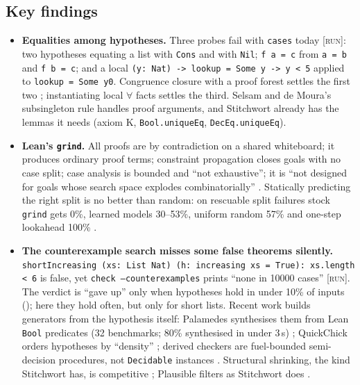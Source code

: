 \documentclass[11pt,a4paper]{article}
\newcommand{\code}[1]{\texttt{#1}}
\newcommand{\file}[1]{\path{#1}}
\newcommand{\run}{\textsc{[run]}}
\begin{document}
\subsection{Key findings}
\begin{itemize}
  \item \textbf{Equalities among hypotheses.} Three probes fail with \code{cases} today \run:
    two hypotheses equating a list with \code{Cons} and with \code{Nil}; \code{f a = c} from
    \code{a = b} and \code{f b = c}; and a local \code{(y: Nat) -> lookup = Some y -> y < 5}
    applied to \code{lookup = Some y0}. Congruence closure with a proof forest settles the first
    two \cite{selsam2016cc,lean2026grindsrc}; instantiating local $\forall$ facts settles the
    third. Selsam and de Moura's subsingleton rule handles proof arguments, and Stitchwort
    already has the lemmas it needs (axiom K, \code{Bool.uniqueEq}, \code{DecEq.uniqueEq}).
  \item \textbf{Lean's \code{grind}.} All proofs are by contradiction on a shared whiteboard;
    it produces ordinary proof terms; constraint propagation closes goals with no case split;
    case analysis is bounded and ``not exhaustive''; it is ``not designed for goals whose search
    space explodes combinatorially'' \cite{lean2026grind,demoura2025grind}. Statically
    predicting the right split is no better than random: on rescuable split failures stock
    \code{grind} gets 0\%, learned models 30--53\%, uniform random 57\% and one-step lookahead
    100\% \cite{wang2026learned}.
  \item \textbf{The counterexample search misses some false theorems silently.}
    \code{shortIncreasing (xs: List Nat) (h: increasing xs = True): xs.length < 6} is false, yet
    \code{check --counterexamples} prints ``none in 10000 cases'' \run. The verdict is ``gave
    up'' only when hypotheses hold in under 10\% of inputs
    (\file{crates/driver/src/counterexample.rs:82}); here they hold often, but only for short
    lists. Recent work builds generators from the hypothesis itself: Palamedes synthesises them
    from Lean \code{Bool} predicates (32 benchmarks; 80\% synthesised in under 3\,s)
    \cite{goldstein2026palamedes}; QuickChick orders hypotheses by ``density''
    \cite{mittelman2026testing}; derived checkers are fuel-bounded semi-decision procedures,
    not \code{Decidable} instances \cite{paraskevopoulou2022computing}. Structural shrinking, the
    kind Stitchwort has, is competitive \cite{keles2026shrinking}; Plausible filters as
    Stitchwort does \cite{plausible2026}.

\end{itemize}
\end{document}
